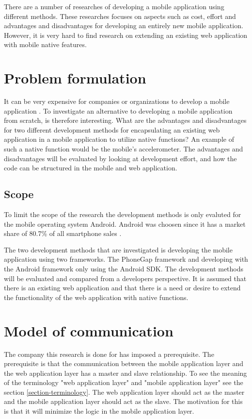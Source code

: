 There are a number of researches of developing a mobile application using different methods. These researches focuses on aspects such as cost, effort and advantages and disadvantages for developing an entirely new mobile application. However, it is very hard to find research on extending an existing web application with mobile native features.

\section{Problem formulation}\label{sec:problem-formulation}
It can be very expensive for companies or organizations to develop a mobile application \cite{kohan2015}. To investigate an alternative to developing a mobile application from scratch, is therefore interesting. What are the advantages and disadvantages for two different development methods for encapsulating an existing web application in a mobile application to utilize native functions? An example of such a native function would be the mobile's accelerometer. The advantages and disadvantages will be evaluated by looking at development effort, and how the code can be structured in the mobile and web application.

\subsection{Scope} \label{subsection-scope}
To limit the scope of the research the development methods is only evaluted for the mobile operating system Android. Android was choosen since it has a market share of 80.7\% of all smartphone sales \cite{gartner2015}.

The two development methods that are investigated is developing the mobile application using two frameworks. The PhoneGap framework and developing with the Android framework only using the Android SDK. The development methods will be evaluated and compared from a developers perspective. It is assumed that there is an existing web application and that there is a need or desire to extend the functionality of the web application with native functions.

\section{Model of communication}
The company this research is done for has imposed a prerequisite. The prerequisite is that the communication between the mobile application layer and the web application layer has a master and slave relationship. To see the meaning of the terminology "web application layer" and "mobile application layer" see the section \ref{section-terminology}. The web application layer should act as the master and the mobile application layer should act as the slave. The motivation for this is that it will minimize the logic in the mobile application layer.

